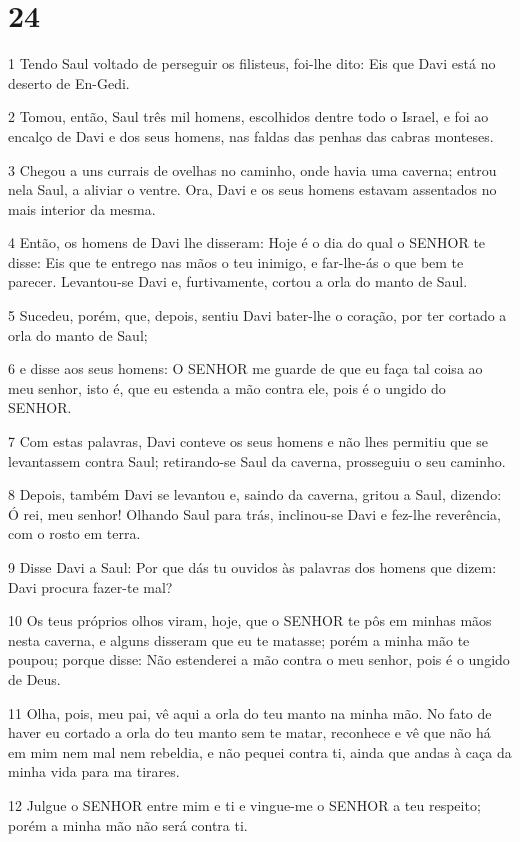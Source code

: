 \chapter{24}

\par 1 Tendo Saul voltado de perseguir os filisteus, foi-lhe dito: Eis que Davi está no deserto de En-Gedi.
\par 2 Tomou, então, Saul três mil homens, escolhidos dentre todo o Israel, e foi ao encalço de Davi e dos seus homens, nas faldas das penhas das cabras monteses.
\par 3 Chegou a uns currais de ovelhas no caminho, onde havia uma caverna; entrou nela Saul, a aliviar o ventre. Ora, Davi e os seus homens estavam assentados no mais interior da mesma.
\par 4 Então, os homens de Davi lhe disseram: Hoje é o dia do qual o SENHOR te disse: Eis que te entrego nas mãos o teu inimigo, e far-lhe-ás o que bem te parecer. Levantou-se Davi e, furtivamente, cortou a orla do manto de Saul.
\par 5 Sucedeu, porém, que, depois, sentiu Davi bater-lhe o coração, por ter cortado a orla do manto de Saul;
\par 6 e disse aos seus homens: O SENHOR me guarde de que eu faça tal coisa ao meu senhor, isto é, que eu estenda a mão contra ele, pois é o ungido do SENHOR.
\par 7 Com estas palavras, Davi conteve os seus homens e não lhes permitiu que se levantassem contra Saul; retirando-se Saul da caverna, prosseguiu o seu caminho.
\par 8 Depois, também Davi se levantou e, saindo da caverna, gritou a Saul, dizendo: Ó rei, meu senhor! Olhando Saul para trás, inclinou-se Davi e fez-lhe reverência, com o rosto em terra.
\par 9 Disse Davi a Saul: Por que dás tu ouvidos às palavras dos homens que dizem: Davi procura fazer-te mal?
\par 10 Os teus próprios olhos viram, hoje, que o SENHOR te pôs em minhas mãos nesta caverna, e alguns disseram que eu te matasse; porém a minha mão te poupou; porque disse: Não estenderei a mão contra o meu senhor, pois é o ungido de Deus.
\par 11 Olha, pois, meu pai, vê aqui a orla do teu manto na minha mão. No fato de haver eu cortado a orla do teu manto sem te matar, reconhece e vê que não há em mim nem mal nem rebeldia, e não pequei contra ti, ainda que andas à caça da minha vida para ma tirares.
\par 12 Julgue o SENHOR entre mim e ti e vingue-me o SENHOR a teu respeito; porém a minha mão não será contra ti.
